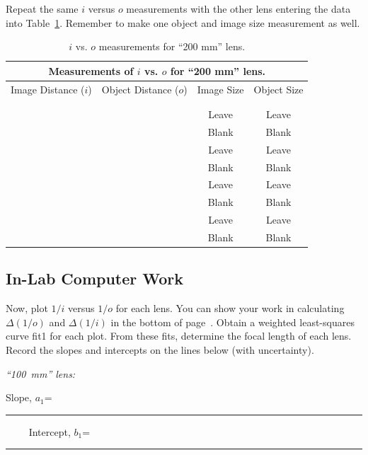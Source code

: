%

\newpage
Repeat the same $i$ versus $o$ measurements with the other lens entering
the data into Table~\ref{tab:OP:238}.  Remember to
make one object and image size measurement as well.
\begin{table}[h]
\begin{center}
\begin{tabular}{|c|c|c|c|}
\hline
\multicolumn{4}{|c|}{Measurements of $i$ vs. $o$ for ``200 mm'' lens.} \\
\hline
Image Distance ($i$) & Object Distance ($o$) & Image Size & Object Size \\
\hline
\hspace*{3cm} & \hspace*{3cm} & \hspace*{3cm} & \hspace*{3cm} \\
& & &  \\
\hline
& & Leave & Leave  \\
& & Blank & Blank \\
\hline
& & Leave & Leave \\
& & Blank & Blank \\
\hline
& & Leave & Leave \\
& & Blank & Blank \\
\hline
& & Leave & Leave \\
& & Blank & Blank \\
\hline
\end{tabular}
\end{center}
\caption{$i$ vs. $o$ measurements for ``200 mm'' lens.}
\label {tab:OP:238}
\end{table}

\subsection{In-Lab Computer Work}
\noindent
Now, plot $1/i$ versus $1/o$ for each lens. You can show your work in
calculating $\Delta(1/o)$ and $\Delta(1/i)$ in the bottom of
page~\pageref{tab:OP:136}. Obtain a weighted least-squares curve fit1 for each
plot. From these fits, determine the focal length of each lens. Record the
slopes and intercepts on the lines below (with uncertainty).

\noindent
{\it ``100~mm'' lens:}
\begin{center}
Slope, $a_1$=~\rule{3cm}{.1mm} ~~~~
Intercept, $b_1$=~\rule{3cm}{.1mm}
\end{center}
\vspace*{.5cm}

